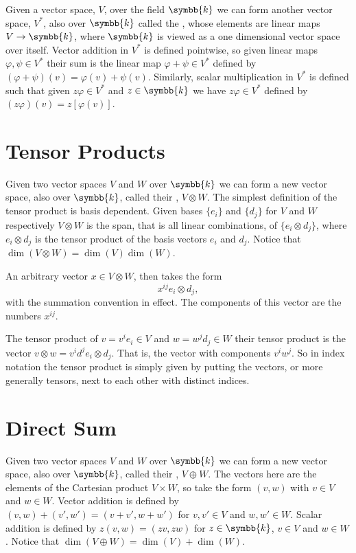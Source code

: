\documentclass[fleqn]{NotesClass}
\renewcommand{\field}{\symbb{k}}
\newcommand{\dual}[1]{{#1^{*}}}
\begin{document}
\begin{appendices}
        Given a vector space, \(V\), over the field \(\field\) we can form another vector space, \(\dual{V}\), also over \(\field\) called the , whose elements are linear maps \(V \to \field\), where \(\field\) is viewed as a one dimensional vector space over itself.
        Vector addition in \(\dual{V}\) is defined pointwise, so given linear maps \(\varphi, \psi \in \dual{V}\) their sum is the linear map \(\varphi + \psi \in \dual{V}\) defined by \((\varphi + \psi)(v) = \varphi(v) + \psi(v)\).
        Similarly, scalar multiplication in \(\dual{V}\) is defined such that given \(z \varphi \in \dual{V}\) and \(z \in \field\) we have \(z\varphi \in \dual{V}\) defined by \((z\varphi)(v) = z[\varphi(v)]\).
        
        \section{Tensor Products}
        Given two vector spaces \(V\) and \(W\) over \(\field\) we can form a new vector space, also over \(\field\), called their , \(V \otimes W\).
        The simplest definition of the tensor product is basis dependent.
        Given bases \(\{e_i\}\) and \(\{d_j\}\) for \(V\) and \(W\) respectively \(V \otimes W\) is the span, that is all linear combinations, of \(\{e_i \otimes d_j\}\), where \(e_i \otimes d_j\) is the tensor product of the basis vectors \(e_i\) and \(d_j\).
        Notice that \(\dim(V \otimes W) = \dim(V) \dim(W)\).
        
        An arbitrary vector \(x \in V \otimes W\), then takes the form
        \begin{equation}
            x^{ij}e_i \otimes d_j,
        \end{equation}
        with the summation convention in effect.
        The components of this vector are the numbers \(x^{ij}\).
        
        The tensor product of \(v = v^ie_i \in V\) and \(w = w^jd_j \in W\) their tensor product is the vector \(v \otimes w = v^id^j e_i \otimes d_j\).
        That is, the vector with components \(v^iw^j\).
        So in index notation the tensor product is simply given by putting the vectors, or more generally tensors, next to each other with distinct indices.
        
        \section{Direct Sum}
        Given two vector spaces \(V\) and \(W\) over \(\field\) we can form a new vector space, also over \(\field\), called their , \(V \oplus W\).
        The vectors here are the elements of the Cartesian product \(V \times W\), so take the form \((v, w)\) with \(v \in V\) and \(w \in W\).
        Vector addition is defined by \((v, w) + (v', w') = (v + v', w + w')\) for \(v, v' \in V\) and \(w, w' \in W\).
        Scalar addition is defined by \(z(v, w) = (zv, zw)\) for \(z \in \field\), \(v \in V\) and \(w \in W\).
        Notice that \(\dim(V \oplus W) = \dim(V) + \dim(W)\).
        

\end{appendices}
\end{document}
